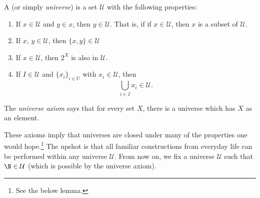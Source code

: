 \documentclass[notes.tex]{subfiles}
\begin{document}
\begin{definition}
  \label{def:universe}
  A  (or simply \emph{universe}) is a set $\mathcal{U}$ with the following properties:
  \begin{enumerate}[label=\emph{U\arabic*.}]
    \item If $x \in \mathcal{U}$ and $y \in x$, then $y \in \mathcal{U}$. That is, if if $x \in \mathcal{U}$, then $x$ is a subset of $\mathcal{U}$.

    \item If $x$, $y \in \mathcal{U}$, then $\{x, y\} \in \mathcal{U}$

    \item If $x \in \mathcal{U}$, then $2^{X}$ is also in $\mathcal{U}$.

    \item If $I \in \mathcal{U}$ and $\{x_{i}\}_{i \in U}$ with $x_{i} \in \mathcal{U}$, then
      \begin{equation*}
        \bigcup_{i \in I} x_{i} \in \mathcal{U}.
      \end{equation*}
  \end{enumerate}
\end{definition}

The \emph{universe axiom} says that for every set $X$, there is a universe which has $X$ as an element.

These axioms imply that universes are closed under many of the properties one would hope.\footnote{See the below lemma.} The upshot is that all familiar constructions from everyday life can be performed within any universe $\mathcal{U}$. From now on, we fix a universe $\mathcal{U}$ such that $\N \in \mathcal{U}$ (which is possible by the universe axiom).
\end{document}
